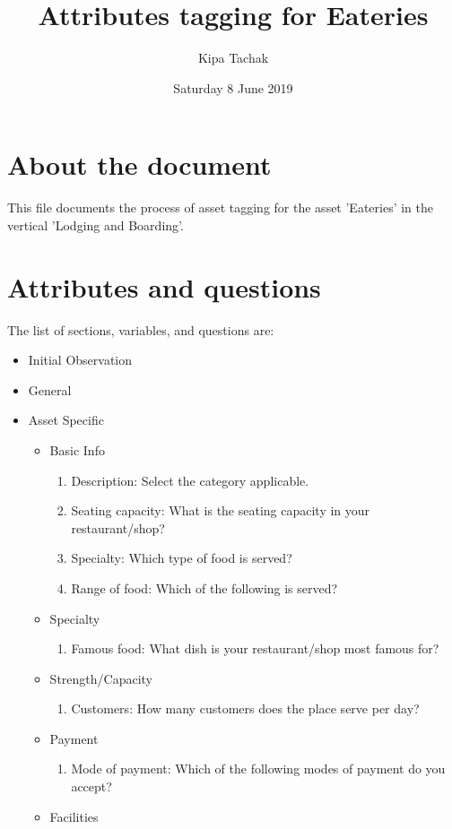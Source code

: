 \documentclass[oneside,twocolumn]{article}
\title{Attributes tagging for Eateries}
\author{Kipa Tachak}
\date{Saturday  8 June 2019}
\begin{document}
\maketitle

\section{About the document}
This file documents the process of asset tagging for the asset 'Eateries' in the vertical 'Lodging and Boarding'.
\section{Attributes and questions}
The list of sections, variables, and questions are:
\begin{itemize}
	\item Initial Observation
	\item General
	\item Asset Specific
		\begin{itemize}
			\item Basic Info
				\begin{enumerate}
					\item Description: Select the category applicable.
					\item Seating capacity: What is the seating capacity in your restaurant/shop?
					\item Specialty: Which type of food is served?
					\item Range of food: Which of the following is served?
				\end{enumerate}
			\item Specialty
				\begin{enumerate}
					\item Famous food: What dish is your restaurant/shop most famous for?
				\end{enumerate}
			\item Strength/Capacity
				\begin{enumerate}
					\item Customers: How many customers does the place serve per day?
				\end{enumerate}
			\item Payment
				\begin{enumerate}
					\item Mode of payment: Which of the following modes of payment do you accept?
				\end{enumerate}
			\item Facilities

\end{itemize}
\end{itemize}
\end{document}

